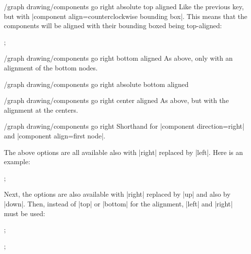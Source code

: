 \begin{key}{/graph drawing/components go right absolute top aligned}
  Like the previous key, but with
  |component align=counterclockwise bounding box|. This means that the
  components will be aligned with their bounding boxed being
  top-aligned: 
\begin{codeexample}[]  
\tikz {};
\end{codeexample}
\end{key}

\begin{key}{/graph drawing/components go right bottom aligned}
  As above, only with an alignment of the bottom nodes.
\end{key}

\begin{key}{/graph drawing/components go right absolute bottom aligned}
\end{key}

\begin{key}{/graph drawing/components go right center aligned}
  As above, but with the alignment at the centers.
\end{key}

\begin{key}{/graph drawing/components go right}
  Shorthand for |component direction=right| and
  |component align=first node|.
\end{key}

The above options are all available also with |right| replaced by
|left|. Here is an example:
\begin{codeexample}[]
\tikz {};
\end{codeexample}
Next, the options are also available with |right| replaced by |up| and
also by |down|. Then, instead of |top| or |bottom| for the alignment,
|left| and |right| must be used:
\begin{codeexample}[]
\tikz {};
\end{codeexample}
\begin{codeexample}[]
\tikz {};
\end{codeexample}



